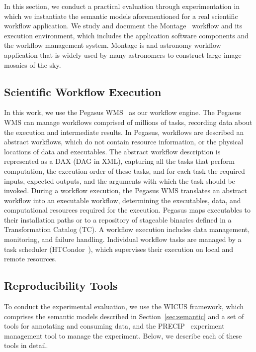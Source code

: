 \documentclass[final,5p,times,twocolumn]{elsarticle}
\begin{document}
In this section, we conduct a practical evaluation through experimentation in which we instantiate the semantic models aforementioned for a real scientific workflow application. We study and document the Montage~\cite{Montage} workflow and its execution environment, which includes the application software components and the workflow management system. Montage is and astronomy workflow application that is widely used by many astronomers to construct large image mosaics of the sky.


\subsection{Scientific Workflow Execution}

In this work, we use the Pegasus WMS~\cite{Pegasus, Deelman-FGCS-2014} as our workflow engine. The Pegasus WMS can manage workflows comprised of millions of tasks, recording data about the execution and intermediate results. In Pegasus, workflows are described an abstract workflows, which do not contain resource information, or the physical locations of data and executables. The abstract workflow description is represented as a DAX (DAG in XML), capturing all the tasks that perform computation, the execution order of these tasks, and for each task the required inputs, expected outputs, and the arguments with which the task should be invoked. During a workflow execution, the Pegasus WMS translates an abstract workflow into an executable workflow, determining the executables, data, and computational resources required for the execution.
Pegasus maps executables to their installation paths or to a repository of stageable binaries defined in a Transformation Catalog (TC).
A workflow execution includes data management, monitoring, and failure handling. Individual workflow tasks are managed by a task scheduler (HTCondor~\cite{condor}), which supervises their execution on local and remote resources.


\subsection{Reproducibility Tools}

To conduct the experimental evaluation, we use the WICUS framework, which comprises the semantic models described in Section~\ref{sec:semantic} and a set of tools for annotating and consuming data, and the PRECIP~\cite{Azarnoosh-CRC-2013} experiment management tool to manage the experiment. Below, we describe each of these tools in detail.
\end{document}

